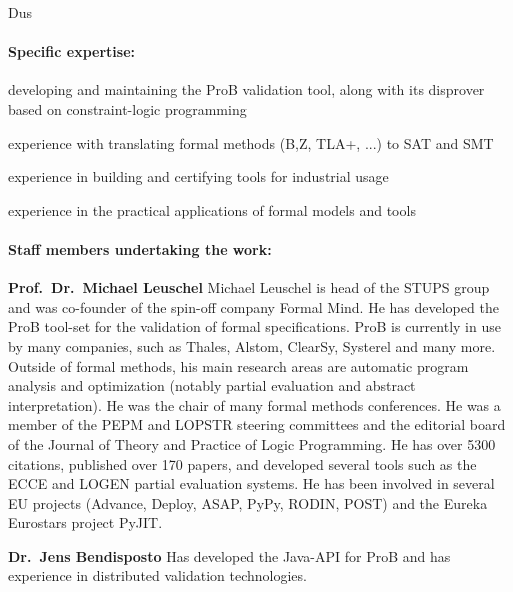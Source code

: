 \begin{sitedescription}{Dus}
\paragraph{Specific expertise:}

\begin{compactitem}
\item {}
      developing and maintaining the ProB validation tool, along with
      its disprover based on constraint-logic programming
 \item experience with translating formal methods (B,Z, TLA+, ...)
       to SAT and SMT
 \item experience in building and certifying tools for industrial usage
 \item experience in the practical applications of formal models and tools
\end{compactitem}

\paragraph{Staff members undertaking the work:}

\textbf{Prof.\ Dr.\ Michael Leuschel}
Michael Leuschel is head of the STUPS group and was co-founder of the spin-off
company Formal Mind.
He has developed the ProB tool-set for the validation of formal specifications.
ProB is currently in use by many companies, such as Thales, Alstom, ClearSy, Systerel 
and many more.
Outside of formal methods, his main research areas are automatic program analysis and optimization (notably partial evaluation and abstract interpretation).
He was the chair of many formal methods conferences.
He was a member of the PEPM and LOPSTR steering committees and
 the editorial board of the Journal of Theory and Practice of Logic Programming.
He has over 5300 citations, published over 170 papers, 
and developed several tools such as the ECCE and LOGEN partial evaluation systems.
He has been involved in several EU projects (Advance, Deploy, ASAP, PyPy, RODIN, POST) and the Eureka Eurostars project PyJIT.

\textbf{Dr.\ Jens Bendisposto}
Has developed the Java-API for ProB and has experience in distributed validation technologies.



\end{sitedescription}

